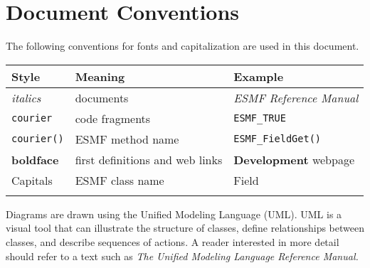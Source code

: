 \section{Document Conventions}
\label{sec:conventions}

The following conventions for fonts and capitalization are used
in this document. \newline

\begin{tabular}{lll}
{\bf Style} & {\bf Meaning} & {\bf Example} \\ \hline
{\it italics}  & documents & {\it ESMF Reference Manual}\\
{\tt courier}  & code fragments & {\tt ESMF\_TRUE}\\
{\tt courier()}  & ESMF method name & {\tt ESMF\_FieldGet()} \\
{\bf boldface} & first definitions and web links & {\bf Development} webpage \\
{Capitals}     & ESMF class name & Field \\ \\
\end{tabular} 
 
Diagrams are drawn using the Unified Modeling Language (UML).  UML is 
a visual tool that can illustrate the structure of 
classes, define relationships between classes, and describe sequences
of actions.  A reader interested in more detail should refer to a 
text such as {\it The Unified Modeling Language Reference Manual.}
 \cite{uml}





